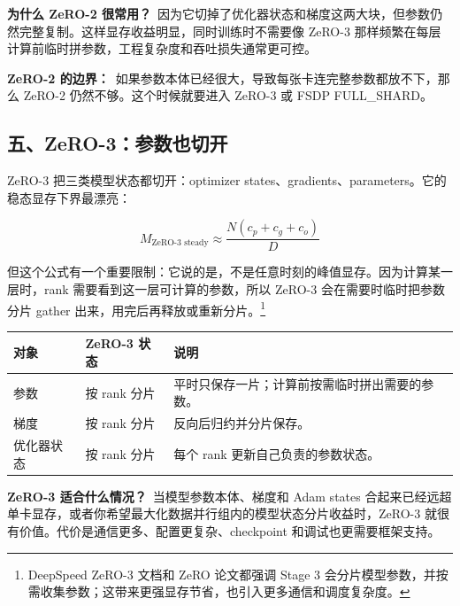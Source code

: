 \begin{intubox}
\textbf{为什么 ZeRO-2 很常用？}\
因为它切掉了优化器状态和梯度这两大块，但参数仍然完整复制。这样显存收益明显，同时训练时不需要像 ZeRO-3 那样频繁在每层计算前临时拼参数，工程复杂度和吞吐损失通常更可控。
\end{intubox}

\begin{warnbox}
\textbf{ZeRO-2 的边界：}\
如果参数本体已经很大，导致每张卡连完整参数都放不下，那么 ZeRO-2 仍然不够。这个时候就要进入 ZeRO-3 或 FSDP FULL\_SHARD。
\end{warnbox}

\subsection{五、ZeRO-3：参数也切开}

ZeRO-3 把三类模型状态都切开：optimizer states、gradients、parameters。它的稳态显存下界最漂亮：

\[
M_{\text{ZeRO-3 steady}}
\approx
\frac{N(c_p+c_g+c_o)}{D}
\]

但这个公式有一个重要限制：它说的是，不是任意时刻的峰值显存。因为计算某一层时，rank 需要看到这一层可计算的参数，所以 ZeRO-3 会在需要时临时把参数分片 gather 出来，用完后再释放或重新分片。\footnote{DeepSpeed ZeRO-3 文档和 ZeRO 论文都强调 Stage 3 会分片模型参数，并按需收集参数；这带来更强显存节省，也引入更多通信和调度复杂度。}

\begin{center}
{\small
\begin{tabular}{p{3.2cm}p{4.2cm}p{5.1cm}}
\hline
\textbf{对象} & \textbf{ZeRO-3 状态} & \textbf{说明} \\
\hline
参数 & 按 rank 分片 & 平时只保存一片；计算前按需临时拼出需要的参数。 \\
梯度 & 按 rank 分片 & 反向后归约并分片保存。 \\
优化器状态 & 按 rank 分片 & 每个 rank 更新自己负责的参数状态。 \\
\hline
\end{tabular}
}
\end{center}

\begin{summarybox}
\textbf{ZeRO-3 适合什么情况？}\
当模型参数本体、梯度和 Adam states 合起来已经远超单卡显存，或者你希望最大化数据并行组内的模型状态分片收益时，ZeRO-3 就很有价值。代价是通信更多、配置更复杂、checkpoint 和调试也更需要框架支持。
\end{summarybox}

